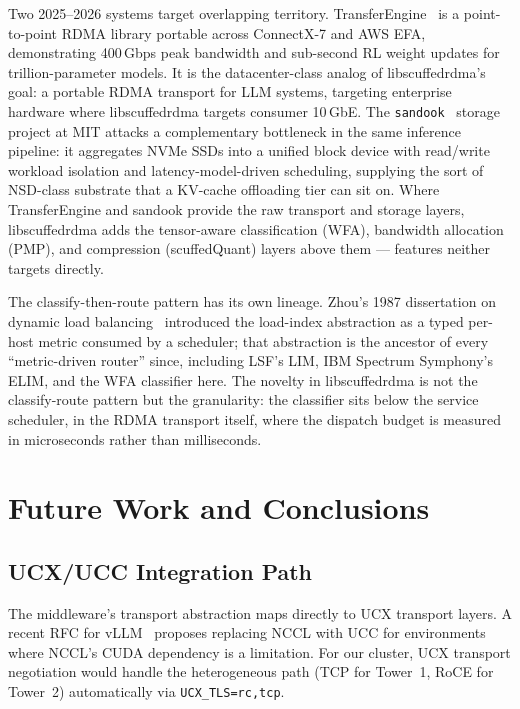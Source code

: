 \documentclass[11pt,letterpaper]{article}
\theoremstyle{definition}
\begin{document}
Two 2025--2026 systems target overlapping territory.
TransferEngine~\cite{chen2025transferengine} is a point-to-point
RDMA library portable across ConnectX-7 and AWS EFA, demonstrating
400\,Gbps peak bandwidth and sub-second RL weight updates for
trillion-parameter models. It is the datacenter-class analog of
libscuffedrdma's goal: a portable RDMA transport for LLM systems,
targeting enterprise hardware where libscuffedrdma targets consumer
10\,GbE. The \texttt{sandook}~\cite{sandook} storage project at MIT
attacks a complementary bottleneck in the same inference pipeline:
it aggregates NVMe SSDs into a unified block device with
read/write workload isolation and latency-model-driven scheduling,
supplying the sort of NSD-class substrate that a KV-cache
offloading tier can sit on. Where TransferEngine and sandook
provide the raw transport and storage layers, libscuffedrdma adds
the tensor-aware classification (WFA), bandwidth allocation (PMP),
and compression (scuffedQuant) layers above them --- features
neither targets directly.

The classify-then-route pattern has its own lineage. Zhou's 1987
dissertation on dynamic load balancing~\cite{zhou1987loadindex}
introduced the load-index abstraction as a typed per-host metric
consumed by a scheduler; that abstraction is the ancestor of every
``metric-driven router'' since, including LSF's LIM, IBM Spectrum
Symphony's ELIM, and the WFA classifier here. The novelty in
libscuffedrdma is not the classify-route pattern but the
granularity: the classifier sits below the service scheduler, in
the RDMA transport itself, where the dispatch budget is measured in
microseconds rather than milliseconds.

\section{Future Work and Conclusions}
\label{sec:conclusions}

\subsection{UCX/UCC Integration Path}

The middleware's transport abstraction maps directly to UCX transport layers. A recent RFC for vLLM~\cite{vllm-ucc-rfc} proposes replacing NCCL with UCC for environments where NCCL's CUDA dependency is a limitation. For our cluster, UCX transport negotiation would handle the heterogeneous path (TCP for Tower~1, RoCE for Tower~2) automatically via \texttt{UCX\_TLS=rc,tcp}.
\end{document}
